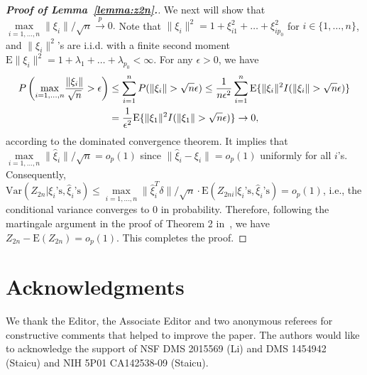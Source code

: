 \documentclass[times,sort&compress,3p]{elsarticle}
\theoremstyle{plain}%
\theoremstyle{definition}
\newcommand{\bxi}{{\xi}}
\begin{document}
\begin{proof}[\textbf{\upshape Proof of Lemma~\ref{lemma:z2n}.}]
	We next will show that $\underset{i = 1, \ldots, n}{\max} \|\bxi_{i}\|/\sqrt{n}\overset{p}{\rightarrow} 0.$ Note that $\|\bxi_{i}\|^2 =  1+\xi_{i1}^2+\ldots+\xi_{ip_0}^2$ for $i \in \{1,\ldots,n\}$, and $\|\bxi_{i}\|^2$'s are i.i.d. with a finite second moment $ \text{E}\|\bxi_{i}\|^2 = 1+\lambda_1+\ldots+\lambda_{p_0} < \infty$. For any $\epsilon > 0$, we have
	\begin{align}
		P\left(\underset{i = 1, \ldots, n}{\max}\frac{\|\bxi_{i}\|}{\sqrt{n}} > \epsilon\right) & \leq \sum_{i = 1}^n P(\|\bxi_i\| > \sqrt{n} \epsilon) \leq \frac{1}{n \epsilon^2} \sum_{i = 1}^n \text E\{\|\bxi_i\|^2 I(\|\bxi_i\| > \sqrt{n} \epsilon)\} \\ & = \frac{1}{\epsilon^2}\text E\{\|\bxi_1\|^2 I(\|\bxi_1\| > \sqrt{n} \epsilon)\} \rightarrow 0, 
	\end{align} 
	according to the dominated convergence theorem. It implies that $\underset{i = 1, \ldots, n}{\max} \|\widehat{\bxi}_{i}\|/\sqrt{n} = o_p(1)$ since $\|\widehat{\bxi}_{i} - \bxi_i\| = o_p(1)$ uniformly for all $i$'s. 
	Consequently, $\text{Var}(Z_{2n}|{\bxi}_i\text{'s}, \widehat{\bxi}_i\text{'s}) \leq \underset{i = 1, \ldots, n}{\max} \|\widehat{\bxi}_{i}^T {\delta}\|/\sqrt{n} \cdot \text{E}(Z_{2ni}|{\bxi}_i\text{'s}, \widehat{\bxi}_i\text{'s}) = o_p(1)$, i.e., the conditional variance converges to 0 in probability. Therefore, following the martingale argument in the proof of Theorem 2 in~\cite{pollard1991}, we have $ Z_{2n}-\text{E}(Z_{2n})=o_{p}(1)$. This completes the proof.
\end{proof} 

\section*{Acknowledgments} 
We thank the Editor, the Associate Editor and two anonymous referees for constructive comments that helped to improve the paper. The authors would like to acknowledge the support of NSF DMS 2015569 (Li) and DMS 1454942 (Staicu) and NIH 5P01 CA142538-09 (Staicu). 	
	



\end{document}
